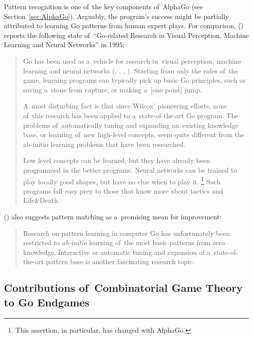 Pattern recognition is one of~the key components of~AlphaGo (see Section~\ref{sec:AlphaGo}).
Arguably, the program's success might be partially attributed to learning Go patterns from human expert plays.
For comparison, (\cite{Muller1995computer}) reports the following state of~``Go-related Research in Visual Perception, Machine Learning and Neural Networks'' in 1995:
\begin{quotation} \noindent
  Go has been used as a~vehicle for research in~visual perception, machine learning and neural networks (\cite{Wilcox79}, \cite{Enderton1991golem}, \cite{Stoutamire1991machine}, \cite{Schraudolph1994temporal}).
  Starting from only the rules of~the game, learning programs can typically pick up basic Go principles, such as saving a~stone from capture, or making a~[one-point] jump.

  A~most disturbing fact is that since Wilcox’ pioneering efforts, none of~this research has been applied to a~state-of-the-art Go program.
  The problems of~automatically tuning and expanding an~existing knowledge base, or learning of~new high-level concepts, seem quite different from the ab-initio learning problems that have been researched.

  Low level concepts can be learned, but they have already been programmed in the better programs.
  Neural networks can be trained to play locally good shapes, but have no clue when to play it.%
  \footnote{This assertion, in particular, has changed with AlphaGo.}
  Such programs fall easy prey to those that know more about tactics and Life\&Death.
\end{quotation}
(\cite{Muller1995computer}) also suggests pattern matching as a~promising mean for improvement:
\begin{quotation} \noindent
  Research on pattern learning in computer Go has unfortunately been restricted to \emph{ab-initio} learning of~the most basic patterns from zero knowledge.
  Interactive or automatic tuning and expansion of a~state-of-the-art pattern base is another fascinating research topic.
\end{quotation}

\subsection{Contributions of~Combinatorial Game Theory to Go Endgames}

